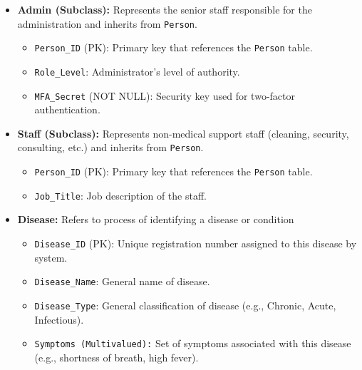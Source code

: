 \documentclass[12pt,a4paper]{article}
\begin{document}
\begin{itemize}[label=\textbf{--}]
	\item \textbf{Admin (Subclass):} Represents the senior staff responsible for the administration and inherits from \texttt{Person}.
	      \begin{itemize}[label=$\bullet$]
		      \item \texttt{Person\_ID} (PK): Primary key that references the \texttt{Person} table.
		      \item \texttt{Role\_Level}: Administrator's level of authority.
		      \item \texttt{MFA\_Secret} (NOT NULL): Security key used for two-factor authentication.
	      \end{itemize}

	\item \textbf{Staff (Subclass):} Represents non-medical support staff (cleaning, security, consulting, etc.) and inherits from \texttt{Person}.
	      \begin{itemize}[label=$\bullet$]
		      \item \texttt{Person\_ID} (PK): Primary key that references the \texttt{Person} table.
		      \item \texttt{Job\_Title}: Job description of the staff.
	      \end{itemize}

	\item \textbf{Disease:} Refers to process of identifying a disease or condition
	      \begin{itemize}[label=$\bullet$]
		      \item \texttt{Disease\_ID} (PK): Unique registration number assigned to this disease by system.
		      \item \texttt{Disease\_Name}: General name of disease.
		      \item \texttt{Disease\_Type}: General classification of disease (e.g., Chronic, Acute, Infectious).
		      \item \texttt{Symptoms (Multivalued):} Set of symptoms associated with this disease (e.g., shortness of breath, high fever).
	      \end{itemize}


\end{itemize}
\end{document}
